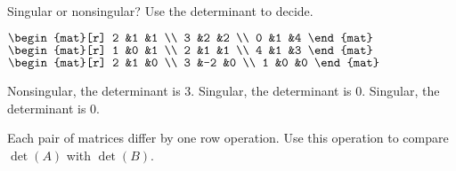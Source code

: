 \begin{exercises}
\begin{answer}
\begin{exparts}
       \end{exparts}  
     \end{answer}
  \item 
     Singular or nonsingular?
     Use the determinant to decide.
     \begin{exparts*}
       \partsitem \(
            \begin{mat}[r]
                2    &1   &1  \\
                3    &2   &2 \\
                0    &1   &4
            \end{mat}    \)
       \partsitem \(
            \begin{mat}[r]
                1    &0   &1  \\
                2    &1   &1 \\
                4    &1   &3
            \end{mat}    \)
       \partsitem \(
            \begin{mat}[r]
                2    &1   &0  \\
                3    &-2  &0 \\
                1    &0   &0
            \end{mat}    \)
     \end{exparts*}
     \begin{answer}
      \begin{exparts}
         \partsitem Nonsingular, the determinant is \( 3 \).
         \partsitem Singular, the determinant is \( 0 \).
         \partsitem Singular, the determinant is \( 0 \).
       \end{exparts}  
     \end{answer}
  \recommended \item
    Each pair of matrices differ by one row operation.
    Use this operation to
    compare \( \det(A) \) with \( \det(B) \).
\end{exercises}
